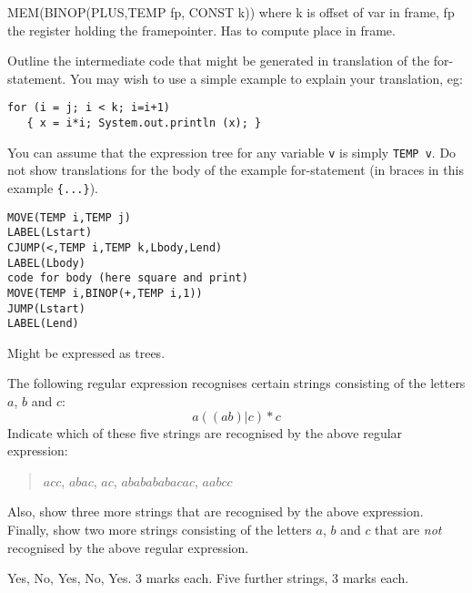 \documentclass[11pt]{bareexam}
\begin{document}
\begin{questions}
\begin{subquestions}
\begin{subsubquestions}
\begin{modelanswer}
MEM(BINOP(PLUS,TEMP fp, CONST k)) where k is offset of var in frame, fp the
register holding the framepointer. Has to compute place in frame.
\end{modelanswer}

\subsubquestion
Outline the intermediate code that might be generated
in translation of the for-statement. You may wish to use a simple
example to explain your translation, eg:
\begin{verbatim}
for (i = j; i < k; i=i+1) 
   { x = i*i; System.out.println (x); }
\end{verbatim}
You can assume that the expression tree for any variable \verb"v" is
simply \verb"TEMP v". Do not show translations for the body of the
example for-statement (in braces in this example \verb+{...}+).

\begin{modelanswer}
\begin{verbatim}
MOVE(TEMP i,TEMP j)
LABEL(Lstart)
CJUMP(<,TEMP i,TEMP k,Lbody,Lend)
LABEL(Lbody)
code for body (here square and print)
MOVE(TEMP i,BINOP(+,TEMP i,1))
JUMP(Lstart)
LABEL(Lend)
\end{verbatim}
Might be expressed as trees.
\end{modelanswer}

\end{subsubquestions}

\end{subquestions}

\newpage

\question

\begin{subquestions}

\subquestion
The following regular expression recognises certain strings consisting of the
letters $a$, $b$ and $c$:
\[
a((ab)|c)*c
\]
Indicate which of these five strings are recognised by the above regular expression:
\begin{quote}
$acc$, $abac$, $ac$, $ababababacac$, $aabcc$
\end{quote}
Also, show three more strings that are recognised by the above expression.
Finally, show two more strings consisting of 
the letters $a$, $b$ and $c$ that are \emph{not} 
recognised by the above regular expression.

\begin{modelanswer}
Yes, No, Yes, No, Yes. 3 marks each. 
Five further strings, 3 marks each.
\end{modelanswer}



\end{subquestions}
\end{questions}
\end{document}
